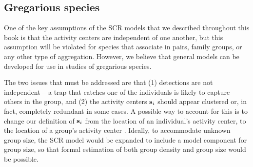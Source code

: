 \subsection{Gregarious species}

One of the key assumptions of the SCR models that we described
throughout this book is that the activity centers are independent of
one another, but this assumption will be violated for %
species that associate in pairs, family groups, or any other type of
aggregation. %
However, we believe that general
models %
can be developed for
use in studies of gregarious species.

The two issues that must be addressed are that (1)
detections are not independent -- a trap that
catches one of the individuals is likely to capture others in the
group, and (2)
the activity centers ${\bf s}_{i}$
should appear clustered or, in fact, completely redundant in some
cases. A possible way to account for this is to change our definition
of ${\bf s}_i$ from the location of an individual's activity center,
to the location of a group's activity center
\citep{russell_etal:2012}. Ideally, to accommodate unknown group size,
the SCR model would be expanded to include a model component for group size,
so that formal estimation of both group density and group size would
be possible.


